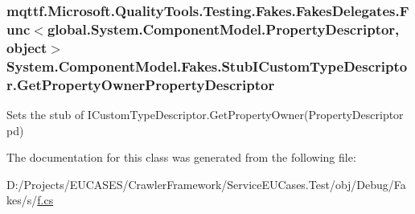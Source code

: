 \hypertarget{class_system_1_1_component_model_1_1_fakes_1_1_stub_i_custom_type_descriptor_a9ca9e7b59c1e77bc668daea764917480}{
\subsubsection[{Get\-Property\-Owner\-Property\-Descriptor}]{\setlength{\rightskip}{0pt plus 5cm}mqttf.\-Microsoft.\-Quality\-Tools.\-Testing.\-Fakes.\-Fakes\-Delegates.\-Func$<$global.\-System.\-Component\-Model.\-Property\-Descriptor, object$>$ System.\-Component\-Model.\-Fakes.\-Stub\-I\-Custom\-Type\-Descriptor.\-Get\-Property\-Owner\-Property\-Descriptor}}\label{class_system_1_1_component_model_1_1_fakes_1_1_stub_i_custom_type_descriptor_a9ca9e7b59c1e77bc668daea764917480}


Sets the stub of I\-Custom\-Type\-Descriptor.\-Get\-Property\-Owner(\-Property\-Descriptor pd)



The documentation for this class was generated from the following file\-:\begin{DoxyCompactItemize}
\item 
D\-:/\-Projects/\-E\-U\-C\-A\-S\-E\-S/\-Crawler\-Framework/\-Service\-E\-U\-Cases.\-Test/obj/\-Debug/\-Fakes/s/\hyperlink{s_2f_8cs}{f.\-cs}\end{DoxyCompactItemize}
